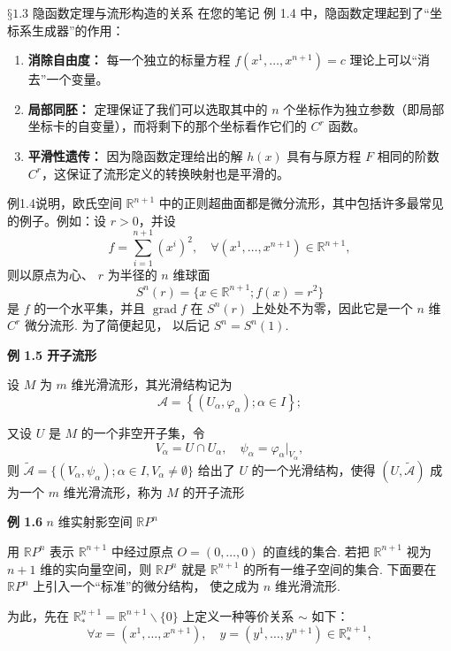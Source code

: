 \begin{myremark}
$§1.3$ 隐函数定理与流形构造的关系
在您的笔记 例 1.4 中，隐函数定理起到了“坐标系生成器”的作用：
\begin{enumerate}
\item \textbf{消除自由度：} 每一个独立的标量方程 $f(x^1, \dots, x^{n+1}) = c$ 理论上可以“消去”一个变量。
\item \textbf{局部同胚：} 定理保证了我们可以选取其中的 $n$ 个坐标作为独立参数（即局部坐标卡的自变量），而将剩下的那个坐标看作它们的 $C^r$ 函数。
\item \textbf{平滑性遗传：} 因为隐函数定理给出的解 $h(x)$ 具有与原方程 $F$ 相同的阶数 $C^r$，这保证了流形定义的转换映射也是平滑的。
\end{enumerate}

例1.4说明，欧氏空间  $\mathbb{R}^{n + 1}$  中的正则超曲面都是微分流形，其中包括许多最常见的例子。例如：设  $r > 0$，并设
$$
f = \sum_ {i = 1} ^ {n + 1} (x ^ {i}) ^ {2}, \quad \forall (x ^ {1}, \dots , x ^ {n + 1}) \in \mathbb {R} ^ {n + 1},
$$
则以原点为心、  $r$  为半径的  $n$  维球面
$$
S^{n} (r) = \{x \in \mathbb {R} ^ {n + 1}; f (x) = r^{2} \}
$$
是  $f$  的一个水平集，并且  $\operatorname{grad} f$  在  $S^n(r)$  上处处不为零，因此它是一个  $n$  维  $C^r$  微分流形. 为了简便起见， 以后记  $S^n = S^n(1)$.
\end{myremark}



{\bf 例 1.5 开子流形}

设  $M$  为  $m$  维光滑流形，其光滑结构记为
$$
\mathcal {A} = \left\{\left(U _ {\alpha}, \varphi_ {\alpha}\right); \alpha \in I \right\};
$$

又设  $U$  是  $M$  的一个非空开子集，令
$$
V _ {\alpha} = U \cap U _ {\alpha}, \quad \psi_ {\alpha} = \varphi_ {\alpha} | _ {V _ {\alpha}},
$$
则  $\tilde{\mathcal{A}} = \{(V_{\alpha},\psi_{\alpha});\alpha \in I,V_{\alpha}\neq \emptyset \}$  给出了  $U$  的一个光滑结构，使得 $(U,\tilde{\mathcal{A}})$  成为一个  $m$  维光滑流形，称为  $M$  的开子流形

{\bf 例 1.6}  $n$  维实射影空间  $\mathbb{R}P^n$

用  $\mathbb{R}P^n$  表示  $\mathbb{R}^{n + 1}$  中经过原点  $O = (0,\dots ,0)$  的直线的集合. 若把  $\mathbb{R}^{n + 1}$  视为  $n + 1$  维的实向量空间，则  $\mathbb{R}P^n$  就是  $\mathbb{R}^{n + 1}$  的所有一维子空间的集合. 下面要在  $\mathbb{R}P^n$  上引入一个“标准”的微分结构， 使之成为  $n$  维光滑流形.

为此，先在  $\mathbb{R}_{*}^{n + 1} = \mathbb{R}^{n + 1}\backslash \{0\}$  上定义一种等价关系  $\sim$  如下：
$$
\forall x = \left(x ^ {1}, \dots , x ^ {n + 1}\right), \quad y = \left(y ^ {1}, \dots , y ^ {n + 1}\right) \in \mathbb {R} _ {*} ^ {n + 1},
$$


